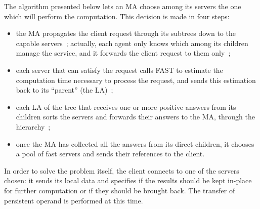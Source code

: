 The algorithm presented below lets an MA choose among its servers the one which
will perform the computation. This decision is made in four steps:
\begin{itemize}
\item the MA propagates the client request through its subtrees down to the
  capable servers~; actually, each agent only knows which among its children manage
  the service, and it forwards the client request to them only~;
\item each server that can satisfy the request calls FAST to estimate the
  computation time necessary to process the request, and sends this
  estimation back to its ``parent'' (the LA)~;
\item each LA of the tree that receives one or more positive answers from its
  children sorts the servers and forwards their answers to the MA, through the
  hierarchy~;
\item once the MA has collected all the answers from its direct children, it
  chooses a pool of fast servers and sends their references to the client.
\end{itemize}


In order to solve the problem itself, the client connects to one of the servers
chosen: it sends its local data and specifies if the results should be kept
in-place for further computation or if they should be brought back. The transfer
of persistent operand is performed at this time.

